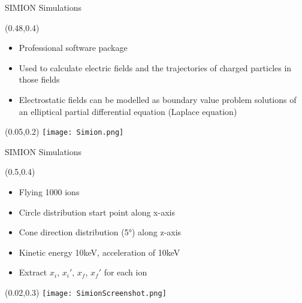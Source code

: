\documentclass[10pt,aspectratio=169]{beamer}
\begin{document}
\begin{frame}{SIMION Simulations}
    \begin{textblock*}{0.5\paperwidth}(0.48\paperwidth,0.4\paperheight)
        \centering
        \begin{itemize}
            \item Professional software package
            \item Used to calculate electric fields and the trajectories of charged particles in those fields
            \item Electrostatic fields can be modelled as boundary value problem solutions of an elliptical partial differential equation (Laplace equation)
        \end{itemize}
    \end{textblock*}
    \begin{textblock*}{0.43\paperwidth}(0.05\paperwidth,0.2\paperheight)
			\centering
			\texttt{[image: Simion.png]}
		\end{textblock*}
  
\end{frame}


\begin{frame}{SIMION Simulations}
    \begin{textblock*}{0.5\paperwidth}(0.5\paperwidth,0.4\paperheight)
        \centering
        \begin{itemize}
            \item Flying 1000 ions
            \item Circle distribution start point along x-axis
            \item Cone direction distribution (5°) along z-axis
            \item Kinetic energy 10keV, acceleration of 10keV
            \item Extract $x_i$, $x_i'$, $x_f$, $x_f'$ for each ion
        \end{itemize}
    \end{textblock*}
    \begin{textblock*}{0.5\paperwidth}(0.02\paperwidth,0.3\paperheight)
			\centering
			\texttt{[image: SimionScreenshot.png]}
		\end{textblock*}
  
\end{frame}
\end{document}
